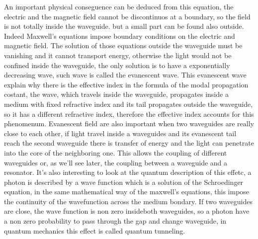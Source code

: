 \documentclass[10pt]{book}
\begin{document}
An important physical conseguence can be deduced from this equation, the electric and the magnetic field cannot be discontinuos at a boundary, so the field is not totally inside the waveguide. but a small part can be found also outside. Indeed Maxwell's equations impose boundary conditions on the electric and magnetic field. The solution of those equations outside the waveguide must be vanishing and it cannot transport energy, otherwise the light would not be confined inside the waveguide, the only solution is to have a exponentially decreasing wave, such wave is called the evanescent wave. This evanescent wave explain why there is the effective index in the formula of the modal propagation costant, the wave, which travels inside the waveguide, propagates inside a medium with fixed refractive index and its tail propagates outside the waveguide, so it has a different refractive index, therefore the effective index accounts for this phenomenum.
Evanescent field are also important when two waveguides are really close to each other, if light travel inside a waveguides and its evanescent tail reach the second waveguide there is transfer of energy and the light can penetrate into the core of the neighboring one. This allows the coupling of different waveguides or, as we'll see later, the coupling between a waveguide and a resonator. It's also interesting to look at the quantum description of this effetc, a photon is described by a wave function which is a solution of the Schroedinger equation, in the same mathematical way of the maxwell's equations, this impose the continuity of the wavefunction across the medium bondary. If two waveguides are close, the wave function is non zero insideboth waveguides, so a photon have a non zero probability to pass through the gap and change waveguide, in quantum mechanics this effect is called quantum tunneling. 
\end{document}
